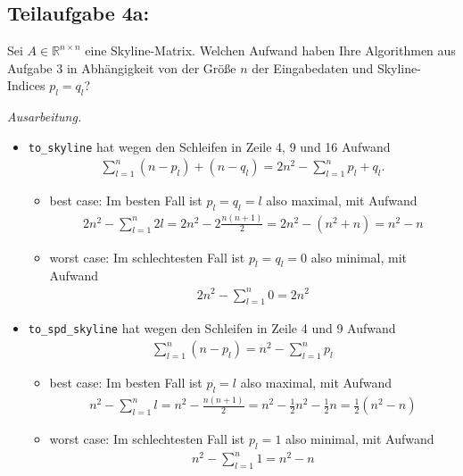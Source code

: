 \documentclass[]{article}
\newenvironment{ausarbeitung}{\vspace{3mm}\noindent\textit{Ausarbeitung.}}{}
\begin{document}
\subsection*{Teilaufgabe 4a:}
Sei $A \in \mathbb{R}^{n\times n}$ eine Skyline-Matrix. Welchen Aufwand haben Ihre Algorithmen aus Aufgabe 3 in Abhängigkeit von der Größe $n$ der Eingabedaten und Skyline-Indices $p_l = q_l$?

\begin{ausarbeitung}
	
	\begin{itemize}
		\item \texttt{to\_skyline} hat wegen den Schleifen in Zeile 4, 9 und 16 Aufwand
		\begin{align*}
			\sum_{l=1}^{n} (n-p_l)+(n-q_l) = 2n^2-\sum_{l=1}^{n}p_l+q_l.
		\end{align*}
		
		\begin{itemize}
			\item best case: Im besten Fall ist $p_l = q_l = l$ also maximal, mit Aufwand
			\begin{align*}
				2n^2-\sum_{l=1}^{n}2l = 2n^2 - 2\frac{n(n+1)}{2} = 2n^2-(n^2+n) = n^2 - n
			\end{align*}
			
			\item worst case: Im schlechtesten Fall ist $p_l = q_l = 0$ also minimal, mit Aufwand
			\begin{align*}
				2n^2 - \sum_{l=1}^{n}0 = 2n^2
			\end{align*}
		\end{itemize}
		
		\item \texttt{to\_spd\_skyline} hat wegen den Schleifen in Zeile 4 und 9 Aufwand 
		\begin{align*}
			\sum_{l=1}^{n}(n-p_l) = n^2 - \sum_{l=1}^{n}p_l
		\end{align*}
		\begin{itemize}
			\item best case: Im besten Fall ist $p_l = l$ also maximal, mit Aufwand 
			\begin{align*}
				n^2 - \sum_{l=1}^{n}l = n^2 - \frac{n(n+1)}{2} = n^2 - \frac{1}{2}n^2 - \frac{1}{2}n = \frac{1}{2}(n^2-n)
			\end{align*}
			\item worst case: Im schlechtesten Fall ist $p_l=1$ also minimal, mit Aufwand 
			\begin{align*}
				n^2 - \sum_{l=1}^{n}1 = n^2 - n
			\end{align*}
		\end{itemize}
	

\end{itemize}
\end{ausarbeitung}
\end{document}
